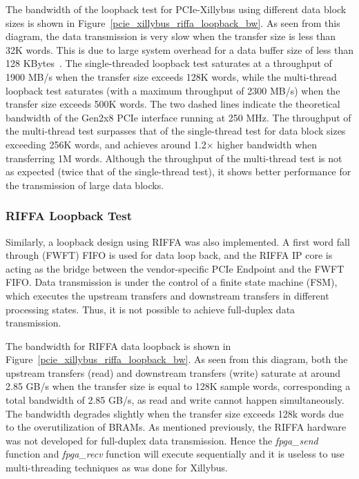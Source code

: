 The bandwidth of the loopback test for PCIe-Xillybus using different data block sizes is shown in Figure~\ref{pcie_xillybus_riffa_loopback_bw}. 
As seen from this diagram, the data transmission is very slow when the transfer size is less than 32K words. 
This is due to large system overhead for a data buffer size of less than 128 KBytes~\cite{xillybus2018}. 
The single-threaded loopback test saturates at a throughput of 1900 MB/s when the transfer size exceeds 128K words, while the multi-thread loopback test saturates (with a maximum throughput of 2300 MB/s) when the transfer size exceeds 500K words. 
The two dashed lines indicate the theoretical bandwidth of the Gen2x8 PCIe interface running at 250 MHz.
The throughput of the multi-thread test surpasses that of the single-thread test for data block sizes exceeding 256K words, and achieves around 1.2$\times$ higher bandwidth when transferring 1M words. 
Although the throughput of the multi-thread test is not as expected (twice that of the single-thread test), it shows better performance for the transmission of large data blocks. 



\subsubsection{RIFFA Loopback Test}
Similarly, a loopback design using RIFFA was also implemented. 
A first word fall through (FWFT) FIFO is used for data loop back, and the RIFFA IP core is acting as the bridge between the vendor-specific PCIe Endpoint and the FWFT FIFO. 
Data transmission is under the control of a finite state machine (FSM), which executes the upstream transfers and downstream transfers in different processing states.  
Thus, it is not possible to achieve full-duplex data transmission. 

The bandwidth for RIFFA data loopback is shown in Figure~\ref{pcie_xillybus_riffa_loopback_bw}. 
As seen from this diagram, both the upstream transfers (read) and downstream transfers (write) saturate at around 2.85 GB/s when the transfer size is equal to 128K sample words, corresponding a total bandwidth of 2.85 GB/s, as read and write cannot happen simultaneously. 
The bandwidth degrades slightly when the transfer size exceeds 128k words due to the overutilization of BRAMs.
As mentioned previously, the RIFFA hardware was not developed for full-duplex data transmission. 
Hence the \textit{fpga\_send} function and \textit{fpga\_recv} function will execute sequentially and it is useless to use multi-threading techniques as was done for Xillybus. 

